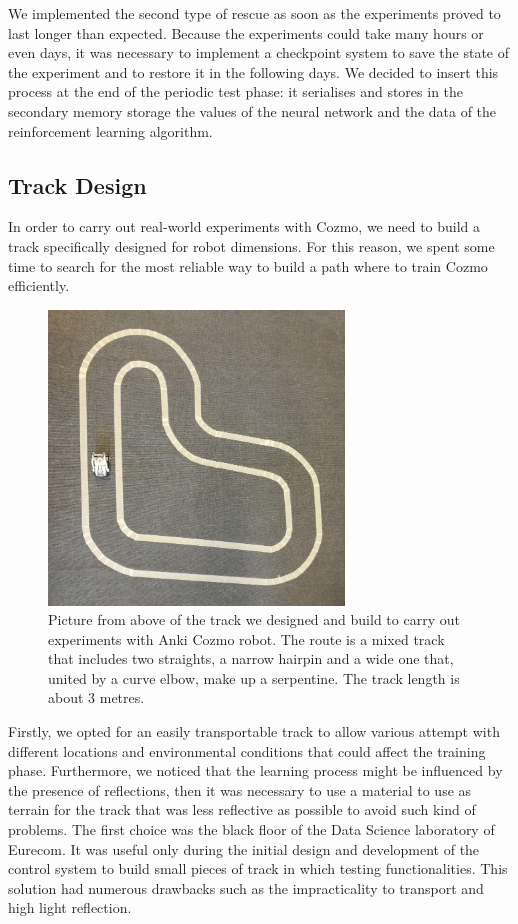 We implemented the second type of rescue as soon as the experiments proved to last longer than expected.
Because the experiments could take many hours or even days, it was necessary to implement a checkpoint system to save the state of the experiment and to restore it in the following days.
We decided to insert this process at the end of the periodic test phase: it serialises and stores in the secondary memory storage the values of the neural network and the data of the reinforcement learning algorithm.

\subsection{Track Design}

In order to carry out real-world experiments with Cozmo, we need to build a track specifically designed for robot dimensions.
For this reason, we spent some time to search for the most reliable way to build a path where to train Cozmo efficiently.

\begin{figure}
    \centering
    \includegraphics[width=0.7\textwidth]{img/track.png}
    \caption[CozmoEnv Racing Track]{ Picture from above of the track we designed and build to carry out experiments with Anki Cozmo robot. The route is a mixed track that includes two straights, a narrow hairpin and a wide one that, united by a curve elbow, make up a serpentine. The track length is about 3 metres.}
    \label{fig:track_cozmo}
\end{figure}


Firstly, we opted for an easily transportable track to allow various attempt with different locations and environmental conditions that could affect the training phase.
Furthermore, we noticed that the learning process might be influenced by the presence of reflections, then it was necessary to use a material to use as terrain for the track that was less reflective as possible to avoid such kind of problems.
The first choice was the black floor of the Data Science laboratory of Eurecom.
It was useful only during the initial design and development of the control system to build small pieces of track in which testing functionalities.
This solution had numerous drawbacks such as the impracticality to transport and high light reflection.


